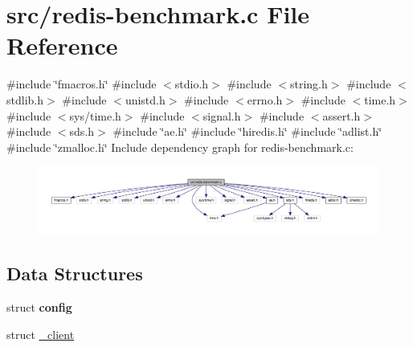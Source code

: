 \hypertarget{redis-benchmark_8c}{}\section{src/redis-\/benchmark.c File Reference}
\label{redis-benchmark_8c}
{\ttfamily \#include \char`\"{}fmacros.\+h\char`\"{}}\newline
{\ttfamily \#include $<$stdio.\+h$>$}\newline
{\ttfamily \#include $<$string.\+h$>$}\newline
{\ttfamily \#include $<$stdlib.\+h$>$}\newline
{\ttfamily \#include $<$unistd.\+h$>$}\newline
{\ttfamily \#include $<$errno.\+h$>$}\newline
{\ttfamily \#include $<$time.\+h$>$}\newline
{\ttfamily \#include $<$sys/time.\+h$>$}\newline
{\ttfamily \#include $<$signal.\+h$>$}\newline
{\ttfamily \#include $<$assert.\+h$>$}\newline
{\ttfamily \#include $<$sds.\+h$>$}\newline
{\ttfamily \#include \char`\"{}ae.\+h\char`\"{}}\newline
{\ttfamily \#include \char`\"{}hiredis.\+h\char`\"{}}\newline
{\ttfamily \#include \char`\"{}adlist.\+h\char`\"{}}\newline
{\ttfamily \#include \char`\"{}zmalloc.\+h\char`\"{}}\newline
Include dependency graph for redis-\/benchmark.c\+:
\nopagebreak
\begin{figure}[H]
\begin{center}
\leavevmode
\includegraphics[width=350pt]{redis-benchmark_8c__incl}
\end{center}
\end{figure}
\subsection*{Data Structures}
\begin{DoxyCompactItemize}
\item 
struct {\bfseries config}
\item 
struct \hyperlink{struct__client}{\+\_\+client}
\end{DoxyCompactItemize}
